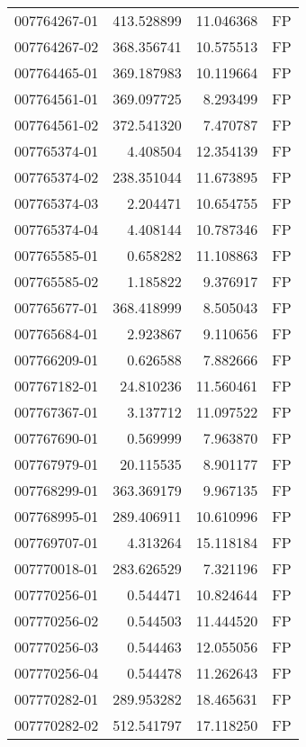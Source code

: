 \begin{tabular}{lrrl}
007764267-01 &  413.528899 &      11.046368 &   FP \\
007764267-02 &  368.356741 &      10.575513 &   FP \\
007764465-01 &  369.187983 &      10.119664 &   FP \\
007764561-01 &  369.097725 &       8.293499 &   FP \\
007764561-02 &  372.541320 &       7.470787 &   FP \\
007765374-01 &    4.408504 &      12.354139 &   FP \\
007765374-02 &  238.351044 &      11.673895 &   FP \\
007765374-03 &    2.204471 &      10.654755 &   FP \\
007765374-04 &    4.408144 &      10.787346 &   FP \\
007765585-01 &    0.658282 &      11.108863 &   FP \\
007765585-02 &    1.185822 &       9.376917 &   FP \\
007765677-01 &  368.418999 &       8.505043 &   FP \\
007765684-01 &    2.923867 &       9.110656 &   FP \\
007766209-01 &    0.626588 &       7.882666 &   FP \\
007767182-01 &   24.810236 &      11.560461 &   FP \\
007767367-01 &    3.137712 &      11.097522 &   FP \\
007767690-01 &    0.569999 &       7.963870 &   FP \\
007767979-01 &   20.115535 &       8.901177 &   FP \\
007768299-01 &  363.369179 &       9.967135 &   FP \\
007768995-01 &  289.406911 &      10.610996 &   FP \\
007769707-01 &    4.313264 &      15.118184 &   FP \\
007770018-01 &  283.626529 &       7.321196 &   FP \\
007770256-01 &    0.544471 &      10.824644 &   FP \\
007770256-02 &    0.544503 &      11.444520 &   FP \\
007770256-03 &    0.544463 &      12.055056 &   FP \\
007770256-04 &    0.544478 &      11.262643 &   FP \\
007770282-01 &  289.953282 &      18.465631 &   FP \\
007770282-02 &  512.541797 &      17.118250 &   FP \\

\end{tabular}
